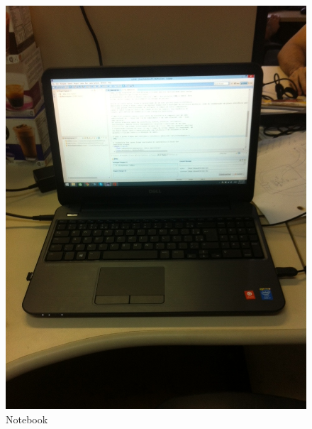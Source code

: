 \begin{figure}[h!]
 \centering
 \includegraphics[width=1\columnwidth]{Notebook/foto}
 \caption{Notebook}
\end{figure}

